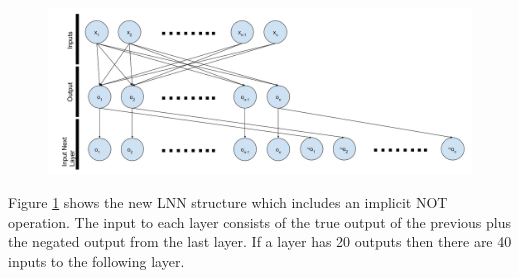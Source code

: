 \begin{figure}[H]
	\centering
	\begin{minipage}[b]{0.9\textwidth}
		\includegraphics[width=\textwidth]{Modified-LNN-Structure.png}
		\caption{}
		\label{fig:modified-lnn-structure}
	\end{minipage}
	\hfill
\end{figure}

Figure \ref{fig:modified-lnn-structure} shows the new LNN structure which includes an implicit NOT operation. The input to each layer consists of the true output of the previous plus the negated output from the last layer. If a layer has 20 outputs then there are 40 inputs to the following layer.
